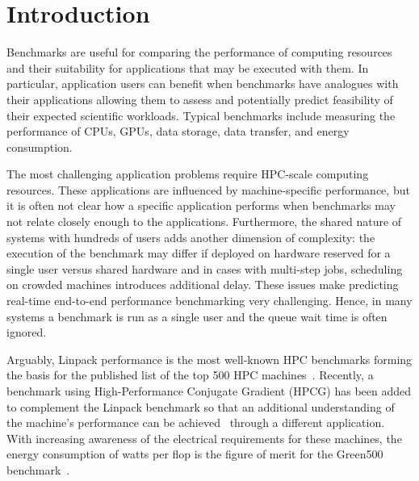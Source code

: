 
\section{Introduction}
\label{sec:introduction}

Benchmarks are useful for comparing the performance of computing resources and their suitability for applications that may be executed with them. In particular, application users can benefit when benchmarks have analogues with their applications allowing them to assess and potentially predict feasibility of their expected scientific workloads. Typical benchmarks include measuring the performance of CPUs, GPUs, data storage, data transfer, and energy consumption.

The most challenging application problems require HPC-scale computing resources. These applications are influenced by machine-specific performance, but it is often not clear how a specific application performs when benchmarks may not relate closely enough to the applications. Furthermore, the shared nature of systems with hundreds of users  adds another dimension of complexity: the execution of the benchmark may differ if deployed on hardware reserved for a single user versus shared hardware and in cases with multi-step jobs, scheduling on crowded machines introduces additional delay. These issues make predicting real-time end-to-end performance benchmarking very challenging. Hence, in many systems a benchmark is run as a single user and the queue wait time is often ignored.

Arguably, Linpack performance is the most well-known HPC benchmarks forming the basis for the published list of the top 500 HPC machines~\citep{www-top500}. Recently, a benchmark using High-Performance Conjugate Gradient (HPCG) has been added to complement the Linpack benchmark so that an additional understanding of the machine's performance can be achieved~\citep{www-top500} through a different application. With increasing awareness of the electrical requirements for these machines, the energy consumption of watts per flop is the figure of merit for the Green500 benchmark~\citep{green500}.

